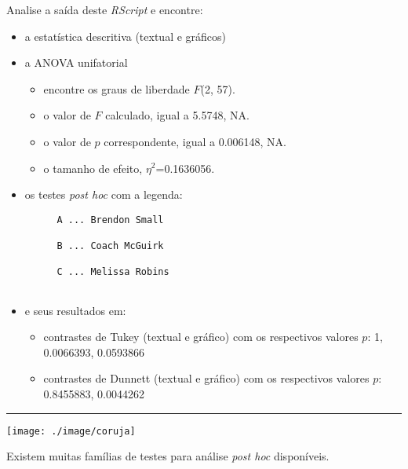 \documentclass[]{article}
\providecommand{\tightlist}{%
  \setlength{\itemsep}{0pt}\setlength{\parskip}{0pt}}
\begin{document}
Analise a saída deste \emph{RScript} e encontre:

\begin{itemize}
\tightlist
\item
  a estatística descritiva (textual e gráficos)
\item
  a ANOVA unifatorial

  \begin{itemize}
  \tightlist
  \item
    encontre os graus de liberdade \(F\)(2, 57).
  \item
    o valor de \(F\) calculado, igual a 5.5748, NA.
  \item
    o valor de \(p\) correspondente, igual a 0.006148, NA.
  \item
    o tamanho de efeito, \(\eta^2\)=0.1636056.
  \end{itemize}
\item
  os testes \emph{post hoc} com a legenda:
\end{itemize}

\begin{verbatim}
         A ... Brendon Small
 
         B ... Coach McGuirk
 
         C ... Melissa Robins
 
\end{verbatim}

\begin{itemize}
\tightlist
\item
  e seus resultados em:

  \begin{itemize}
  \tightlist
  \item
    contrastes de Tukey (textual e gráfico) com os respectivos valores
    \(p\): 1, 0.0066393, 0.0593866
  \item
    contrastes de Dunnett (textual e gráfico) com os respectivos valores
    \(p\): 0.8455883, 0.0044262
  \end{itemize}
\end{itemize}

\begin{center}\rule{0.5\linewidth}{\linethickness}\end{center}

\begin{flushleft}\texttt{[image: ./image/coruja]} \end{flushleft}

Existem muitas famílias de testes para análise \emph{post hoc}
disponíveis.
\end{document}
